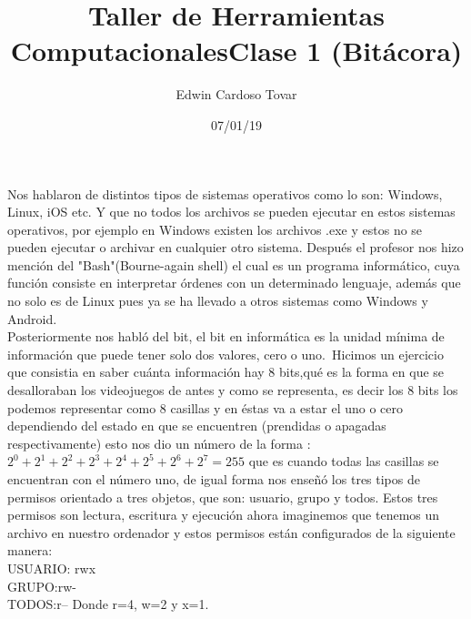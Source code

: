 \documentclass[letterpaper, 12pt, oneside]{article}%
\title{\Huge Taller de Herramientas Computacionales}
\author{Edwin Cardoso Tovar}%
\date{07/01/19}%
\begin{document}
	\maketitle
	\begin{center}%
	\end{center}%
	\newpage%
	
	\title{\Huge Clase 1 (Bitácora)  \\}%
	
	Nos hablaron de distintos tipos de sistemas operativos como lo son: Windows, Linux, iOS etc. Y que no todos los archivos se pueden ejecutar en estos sistemas operativos, por ejemplo en Windows existen los archivos .exe y estos no se pueden ejecutar o archivar en cualquier otro sistema. Después el profesor nos hizo mención del "Bash"(Bourne-again shell) el cual es un programa informático, cuya función consiste en interpretar órdenes con un determinado lenguaje, además que no solo es de Linux pues ya se ha llevado a otros sistemas como Windows y Android.\\
	
	Posteriormente nos habló del bit, el bit en informática es la unidad mínima de información que puede tener solo dos valores, cero o uno.\
	Hicimos un ejercicio que consistia en saber cuánta información hay 8 bits,qué es la forma en que se desalloraban los videojuegos de antes y como se representa, es decir los 8 bits los podemos representar como 8 casillas y en éstas va a estar el uno o cero dependiendo del estado en que se encuentren (prendidas o apagadas respectivamente) esto nos dio un número de la forma :  $2^0 + 2^1 + 2^2 + 2^3 + 2^4 + 2^5 + 2^6 + 2^7= 255$ que es cuando todas las casillas se encuentran con el número uno, de igual forma nos enseñó los tres tipos de permisos orientado a tres objetos, que son: usuario, grupo y todos. Estos tres permisos son lectura, escritura  y ejecución ahora imaginemos que tenemos un archivo  en nuestro ordenador y estos permisos están configurados de la siguiente manera:\\
	USUARIO: rwx\\
	GRUPO:rw-\\
	TODOS:r--      Donde r=4, w=2 y x=1.\\
	
\end{document}
